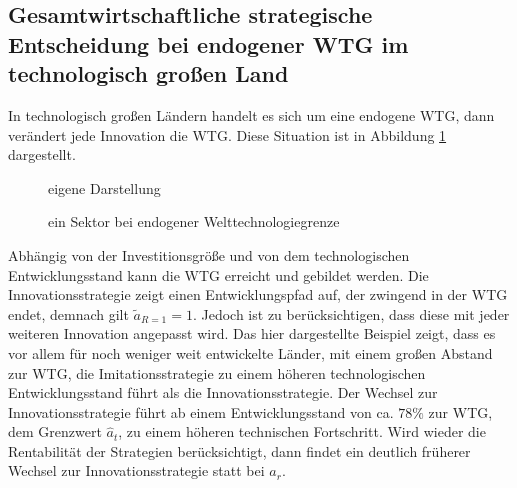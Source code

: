 \subsection{Gesamtwirtschaftliche strategische Entscheidung bei endogener WTG im technologisch großen Land}
In technologisch großen Ländern handelt es sich um eine endogene WTG, dann verändert jede Innovation die WTG. Diese Situation ist in Abbildung \ref{fig:ein Sektor endogene WTG} dargestellt.
%
		\begin{figure}[htb]
			\hfill{}  eigene Darstellung
			\caption{ein Sektor bei endogener Welttechnologiegrenze}
			\label{fig:ein Sektor endogene WTG}
		\end{figure}


Abhängig von der Investitionsgröße und von dem technologischen Entwicklungsstand kann die WTG erreicht und gebildet werden. Die Innovationsstrategie zeigt einen Entwicklungspfad auf, der zwingend in der WTG endet, demnach gilt $\tilde{a}_{R=1}=1$. Jedoch ist zu berücksichtigen, dass diese mit jeder weiteren Innovation angepasst wird. Das hier dargestellte Beispiel zeigt, dass es vor allem für noch weniger weit entwickelte Länder, mit einem großen Abstand zur WTG, die \textcolor[rgb]{0,0.32,0}{Imitationsstrategie} zu einem höheren technologischen Entwicklungsstand führt als die \textcolor[rgb]{0.74,0.97,0.22}{Innovationsstrategie}. Der Wechsel zur \textcolor[rgb]{0.74,0.97,0.22}{Innovationsstrategie} führt ab einem Entwicklungsstand von ca. $78\%$ zur WTG, dem Grenzwert $\hat{a}_t$, zu einem höheren technischen Fortschritt. Wird wieder die Rentabilität der Strategien berücksichtigt, dann findet ein deutlich früherer Wechsel zur Innovationsstrategie statt bei $a_r$.

